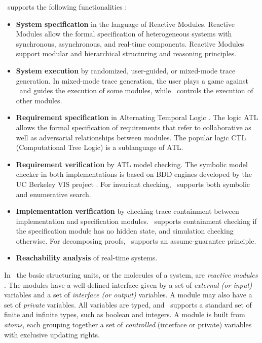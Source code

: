 \mocha \ supports the following functionalities \cite{mochaman}:
\begin{itemize}
\item \textbf{System specification} in the language of Reactive
Modules. Reactive Modules allow the formal specification of
heterogeneous systems with synchronous, asynchronous, and
real-time components. Reactive Modules support modular and
hierarchical structuring and reasoning principles.

\item \textbf{System execution} by randomized, user-guided, or
mixed-mode trace generation. In mixed-mode trace generation, the
user plays a game against \mocha \ and guides the execution of
some modules, while \mocha \ controls the execution of other
modules.

\item \textbf{Requirement specification} in Alternating Temporal
Logic \cite{ATL}. The logic ATL allows the formal specification of
requirements that refer to collaborative as well as adversarial
relationships between modules. The popular logic CTL
(Computational Tree Logic) \cite{ATL} is a sublanguage of ATL.

\item \textbf{Requirement verification} by ATL model checking. The
symbolic model checker in both implementations is based on BDD
engines developed by the UC Berkeley VIS project \cite{VIS96}. For
invariant checking, \mocha \ supports both symbolic and
enumerative search.

\item \textbf{Implementation verification} by checking trace
containment between implementation and specification modules.
\mocha \ supports containment checking if the specification module
has no hidden state, and simulation checking otherwise. For
decomposing proofs, \mocha \ supports an assume-guarantee
principle.

\item \textbf{Reachability analysis} of real-time systems.
\end{itemize}

In \mocha\ the basic structuring units, or the molecules of a
system, are {\em reactive modules} \cite{RM96journal}. The modules have
a well-defined interface given by a set of \emph{external (or
input)} variables and a set of {\em interface (or output)}
variables. A module may also have a set of {\em private}
variables. All variables are typed, and \mocha \ supports a
standard set of finite and infinite types, such as boolean and
integers. A module is built from \emph{atoms}, each grouping
together a set of \emph{controlled} (interface or private)
variables with exclusive updating rights.

